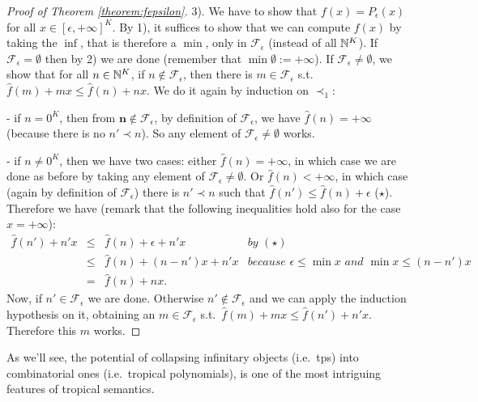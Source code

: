 \begin{proof}[Proof of Theorem \ref{theorem:fepsilon}]
3).
We have to show that $f( x )=P_\epsilon( x )$ for all $ x \in [\epsilon,+\infty]^{K}$.
By 1), it suffices to show that we can compute $f( x )$ by taking the $\inf$, that is therefore a $\min$, only in $\mathcal F_\epsilon$ (instead of all $\mathbb{N}^{K}$).
If $\mathcal F_\epsilon=\emptyset$ then by 2) we are done (remember that $\min\emptyset := +\infty$).
If $\mathcal F_\epsilon\neq\emptyset$, we show that for all $ n  \in\mathbb{N}^{K}$, if $ n   \notin\mathcal F_\epsilon$, then there is $ m  \in\mathcal F_\epsilon$ s.t.\ $\hat f( m  )+ m   x  \leq \hat f( n  )+ n   x $.
We do it again by induction on $\prec_{1}$:

- if $ n  =0^{K}$, then from $\mathbf  n\notin \mathcal F_{\epsilon}$, by definition of $\mathcal F_\epsilon$, we have $\hat f( n  )=+\infty$ (because there is no $ n  '\prec n  $).
So any element of $\mathcal F_\epsilon\neq\emptyset$ works.

- if $ n  \neq 0^{K}$, then we have two cases:
either $\hat f( n  )=+\infty$, in which case we are done as before by taking any element of $\mathcal F_\epsilon\neq\emptyset$.
Or $\hat f( n  )<+\infty$, in which case (again by definition of $\mathcal F_\epsilon$) there is $ n  '\prec n  $ such that $ \hat f( n  ')\leq \hat f( n  )+\epsilon$  ($\star$).
Therefore we have (remark that the following inequalities hold also for the case $x=+\infty$):
\[\begin{array}{rclr}
 \hat f( n  ')+ n  ' x  & \leq & \hat f( n  ) + \epsilon +  n' x  & \textit{by }(\star) \\
 & \leq & \hat f( n  ) + ( n  - n  ') x  +  n  ' x  & \textit{because $\epsilon\leq\min x $ and $\min  x \leq( n  -  n') x $} \\
 & = & \hat f( n  )+  n   x . &
\end{array}\]
Now, if $ n  '\in\mathcal F_\epsilon$ we are done.
Otherwise $ n  '\notin\mathcal F_\epsilon$ and we can apply the induction hypothesis on it, obtaining an $ m  \in\mathcal F_\epsilon$ s.t.\ $\hat f( m  )+ m   x  \leq \hat f( n  ')+ n  ' x $.
Therefore this $ m  $ works.
\end{proof}




As we'll see, the potential of collapsing infinitary objects (i.e.~tps) into combinatorial ones (i.e.~tropical polynomials), is one of the most intriguing features of tropical semantics. 

%

